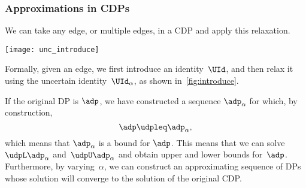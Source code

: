 \subsubsection{Approximations in CDPs}

We can take any edge, or multiple edges, in a CDP and apply this relaxation.

\begin{marginfigure}
    \texttt{[image: unc\_introduce]}
    \caption{}
    \label{fig:introduce}
\end{marginfigure}

Formally, given an edge, we first introduce an identity~$\UId$, and then relax it using the uncertain identity~$\UId_{\alpha}$,
as shown in~\cref{fig:introduce}.

If the original DP is $\adp$, we have constructed a sequence $\adp_\alpha$ for which, by construction,
%
\begin{equation}
    \adp\udpleq\adp_{\alpha},
\end{equation}
%
which means that $\adp_{\alpha}$ is a bound for  $\adp$.
This means that we can solve~$\udpL\adp_{\alpha}$ and~$\udpU\adp_{\alpha}$ and obtain upper and lower bounds for~$\adp$.
Furthermore, by varying~$\alpha$, we can construct an approximating sequence of DPs whose solution will converge to the solution of the original CDP.

%

